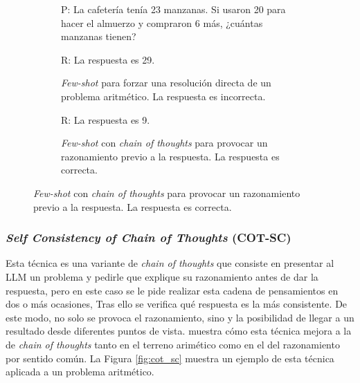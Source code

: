 \begin{figure}[H]
\begin{subfigure}{.48\textwidth}
\begin{mdframed}
        P: La cafetería tenía 23 manzanas. Si usaron 20 para hacer el almuerzo y compraron 6 más, ¿cuántas manzanas tienen?
        \vspace{0.2cm}
      \end{mdframed}
    \end{subfigure}

    \vspace{0.2cm}

    \begin{subfigure}{.48\textwidth}
        \centering
        \begin{mdframed}
        R: La respuesta es 29.
        \end{mdframed}
        \caption{\textit{Few-shot} para forzar una resolución directa de un problema aritmético. La respuesta es incorrecta.}
      \end{subfigure}\hfill
    \begin{subfigure}{.48\textwidth}
      \centering
      \begin{mdframed}
        R:  La respuesta es 9.
      \end{mdframed}
      \caption{\textit{Few-shot} con \textit{chain of thoughts} para provocar un razonamiento previo a la respuesta. La respuesta es correcta.}
    \end{subfigure}

    \label{fig:chain_of_thoughts}
\end{figure}

\subsubsection{\textit{Self Consistency of Chain of Thoughts} (COT-SC)}

Esta técnica es una variante de \textit{chain of thoughts} que consiste en presentar al LLM un problema y pedirle que explique su razonamiento antes de dar la respuesta, pero en este caso se le pide realizar esta cadena de pensamientos en dos o más ocasiones, Tras ello se verifica qué respuesta es la más consistente. De este modo, no solo se provoca el razonamiento, sino y la posibilidad de llegar a un resultado desde diferentes puntos de vista. \cite{wangSelfConsistencyImprovesChain2023} muestra cómo esta técnica mejora a la de \textit{chain of thoughts} tanto en el terreno arimético como en el del razonamiento por sentido común. La Figura \ref{fig:cot_sc} muestra un ejemplo de esta técnica aplicada a un problema aritmético.

